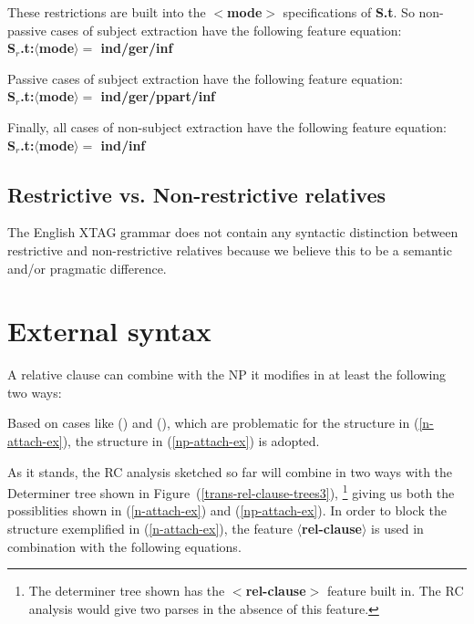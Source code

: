 These restrictions are built into the {\bf $<$mode$>$} specifications
of {\bf S.t}. So non-passive cases of subject extraction have the following
feature equation:\\
{\bf S$_{r}$.t:$\langle$mode$\rangle =$ ind/ger/inf}

Passive cases of subject extraction have the following
feature equation:\\
{\bf S$_{r}$.t:$\langle$mode$\rangle =$ ind/ger/ppart/inf}

Finally, all cases of non-subject extraction have the following
feature equation:\\
{\bf S$_{r}$.t:$\langle$mode$\rangle =$ ind/inf}\\

\subsection{Restrictive vs. Non-restrictive relatives}

The English XTAG grammar does not contain any  syntactic distinction between
restrictive and non-restrictive relatives because we believe this to
be a semantic and/or pragmatic difference.

\section{External syntax}
A relative clause can combine with the NP it modifies in at least 
the following two ways:

\label{n-attach-ex}
\label{np-attach-ex}

Based on cases like () and (), which are problematic for the
structure in (\ref{n-attach-ex}), the structure in (\ref{np-attach-ex}) is adopted.


As it stands, the RC analysis sketched so far will combine in two
ways with the Determiner tree shown in Figure~(\ref{trans-rel-clause-trees3}),
\footnote{The determiner tree shown has the {\bf $<$rel-clause$>$} 
feature built in. The RC analysis would give two
parses in the absence of this feature.}
giving us both the possiblities shown in (\ref{n-attach-ex}) and (\ref{np-attach-ex}). In order
to block the structure exemplified in (\ref{n-attach-ex}), the feature 
{\bf $\langle$rel-clause$\rangle$} is used in combination with the following
equations.

